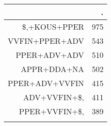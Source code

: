 \begin{tabular}{rr}
  \lsptoprule
 & . \\ 
  \midrule
\$,+KOUS+PPER & 975 \\ 
  VVFIN+PPER+ADV & 543 \\ 
  PPER+ADV+ADV & 510 \\ 
  APPR+DDA+NA & 502 \\ 
  PPER+ADV+VVFIN & 415 \\ 
  ADV+VVFIN+\$, & 411 \\ 
  PPER+VVFIN+\$, & 389 \\ 
   \lspbottomrule
\end{tabular}
